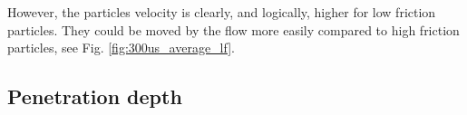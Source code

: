 However, the particles velocity is clearly, and logically, higher for low
friction particles. 
They could be moved by the flow more easily compared to high
friction particles, see Fig. \ref{fig:300us_average_lf}.






\subsection{Penetration depth}
\label{subsec:penetrationdepth}

